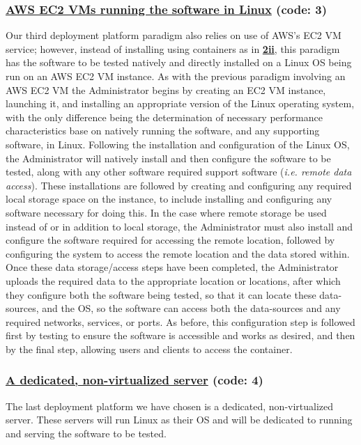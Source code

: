 \documentclass{article}[12pt]
\numberwithin{equation}{section}
\begin{document}
\begin{flushleft}
\subsubsection{\underline{AWS EC2 VMs running the software in Linux} (code: \textbf{3})}
\begin{spacing}{1.5}
	Our third deployment platform paradigm also relies on use of AWS's EC2 VM service; however, instead of installing using containers as in \textbf{\underline{2ii}}, this paradigm has the software to be tested natively and directly installed on a Linux OS being run on an AWS EC2 VM instance.  As with the previous paradigm involving an AWS EC2 VM the Administrator begins by creating an EC2 VM instance, launching it, and installing an appropriate version of the Linux operating system, with the only difference being the determination of necessary performance characteristics base on natively running the software, and any supporting software, in Linux.  Following the installation and configuration of the Linux OS, the Administrator will natively install and then configure the software to be tested, along with any other software required support software (\emph{i.e. remote data access}).  These installations are followed by creating and configuring any required local storage space on the instance, to include installing and configuring any software necessary for doing this.  In the case where remote storage be used instead of or in addition to local storage, the Administrator must also install and configure the software required for accessing the remote location, followed by configuring the system to access the remote location and the data stored within.  Once these data storage/access steps have been completed, the Administrator uploads the required data to the appropriate location or locations, after which they configure both the software being tested, so that it can locate these data-sources, and the OS, so the software can access both the data-sources and any required networks, services, or ports.  As before, this configuration step is followed first by testing to ensure the software is accessible and works as desired, and then by the final step, allowing users and clients to access the container.
\end{spacing}


\subsubsection{\underline{A dedicated, non-virtualized server} (code: \textbf{4})}
\begin{spacing}{1.5}
	The last deployment platform we have chosen is a dedicated, non-virtualized server.  These servers will run Linux as their OS and will be dedicated to running and serving the software to be tested.
\end{spacing}


















\end{flushleft}
\end{document}
